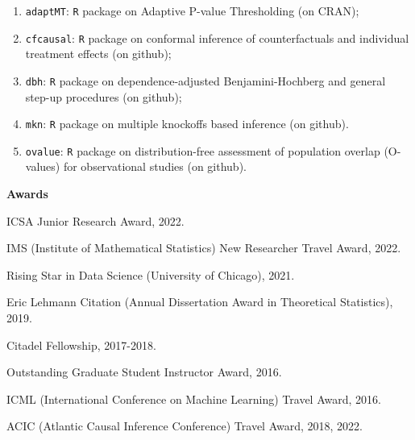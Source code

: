 \documentclass{article}
\begin{document}
\begin{enumerate}
\item \texttt{adaptMT}: \texttt{R} package on Adaptive P-value Thresholding (on CRAN);
\item \texttt{cfcausal}: \texttt{R} package on conformal inference of counterfactuals and individual treatment effects (on github);
\item \texttt{dbh}: \texttt{R} package on dependence-adjusted Benjamini-Hochberg and general step-up procedures (on github);
\item \texttt{mkn}: \texttt{R} package on multiple knockoffs based inference (on github).
\item \texttt{ovalue}: \texttt{R} package on distribution-free assessment of population overlap (O-values) for observational studies (on github).
\end{enumerate}

\vspace{3mm}
\begin{large}
\noindent \textbf{Awards}
\end{large}

\vspace{5mm}

ICSA Junior Research Award, 2022.

\vspace{2mm}

IMS (Institute of Mathematical Statistics) New Researcher Travel Award, 2022.

\vspace{2mm}

Rising Star in Data Science (University of Chicago), 2021.

\vspace{2mm}

Eric Lehmann Citation (Annual Dissertation Award in Theoretical Statistics), 2019.

\vspace{2mm}

Citadel Fellowship, 2017-2018.

\vspace{2mm}

Outstanding Graduate Student Instructor Award, 2016.

\vspace{2mm}
ICML (International Conference on Machine Learning) Travel Award, 2016.

\vspace{2mm}
ACIC (Atlantic Causal Inference Conference) Travel Award, 2018, 2022.
\end{document}
